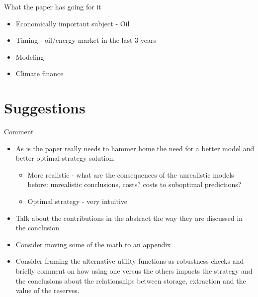 \documentclass[xcolor=table]{beamer}
\begin{document}
\begin{frame}{What the paper has going for it}
\begin{itemize}[<+->]
	\item Economically important subject - Oil
	\item Timing - oil/energy market in the last 3 years
	\item Modeling
	\item Climate finance
\end{itemize}
\end{frame}

\section{Suggestions}

\begin{frame}{Comment}
\begin{itemize}[<+->]
	\item As is the paper really needs to hammer home the need for a better model and better optimal strategy solution.
	\begin{itemize}[<+->]
		\item More realistic - what are the consequences of the unrealistic models before: unrealistic conclusions, costs? costs to suboptimal predictions?
		\item Optimal strategy - very intuitive
	\end{itemize}
	\item Talk about the contributions in the abstract the way they are discussed in the conclusion
	\item Consider moving some of the math to an appendix
	\item Consider framing the alternative utility functions as robustness checks and briefly comment on how using one versus the others impacts the strategy and the conclusions about the relationships between storage, extraction and the value of the reserves.
\end{itemize}
\end{frame}
\end{document}
